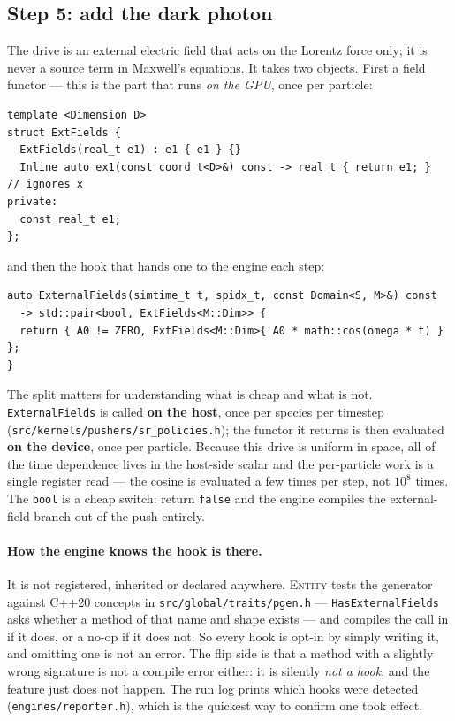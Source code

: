 \documentclass[11pt,a4paper]{article}
\newcommand{\code}[1]{\texttt{\small #1}}
\begin{document}
\subsection{Step 5: add the dark photon}

The drive is an external electric field that acts on the Lorentz force only; it is
never a source term in Maxwell's equations. It takes two objects. First a field
functor --- this is the part that runs \emph{on the GPU}, once per particle:

\begin{lstlisting}
template <Dimension D>
struct ExtFields {
  ExtFields(real_t e1) : e1 { e1 } {}
  Inline auto ex1(const coord_t<D>&) const -> real_t { return e1; }   // ignores x
private:
  const real_t e1;
};
\end{lstlisting}

and then the hook that hands one to the engine each step:

\begin{lstlisting}
auto ExternalFields(simtime_t t, spidx_t, const Domain<S, M>&) const
  -> std::pair<bool, ExtFields<M::Dim>> {
  return { A0 != ZERO, ExtFields<M::Dim>{ A0 * math::cos(omega * t) } };
}
\end{lstlisting}

The split matters for understanding what is cheap and what is not.
\code{ExternalFields} is called \textbf{on the host}, once per species per timestep
(\code{src/kernels/pushers/sr\_policies.h}); the functor it returns is then evaluated
\textbf{on the device}, once per particle. Because this drive is uniform in space, all
of the time dependence lives in the host-side scalar and the per-particle work is a
single register read --- the cosine is evaluated a few times per step, not $10^8$
times. The \code{bool} is a cheap switch: return \code{false} and the engine compiles
the external-field branch out of the push entirely.

\paragraph{How the engine knows the hook is there.} It is not registered, inherited or
declared anywhere. \textsc{Entity} tests the generator against C++20 concepts in
\code{src/global/traits/pgen.h} --- \code{HasExternalFields} asks whether a method of
that name and shape exists --- and compiles the call in if it does, or a no-op if it
does not. So every hook is opt-in by simply writing it, and omitting one is not an
error. The flip side is that a method with a slightly wrong signature is not a
compile error either: it is silently \emph{not a hook}, and the feature just does not
happen. The run log prints which hooks were detected (\code{engines/reporter.h}),
which is the quickest way to confirm one took effect.
\end{document}
